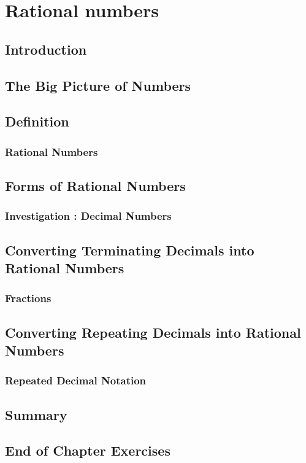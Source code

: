          \chapter{Rational numbers}
    \section{ Introduction}
    \section{ The Big Picture of Numbers}
    \section{ Definition}
            \subsection{ Rational Numbers }
    \section{ Forms of Rational Numbers}
            \subsection{  Investigation : Decimal Numbers }
    \section{ Converting Terminating Decimals into Rational Numbers}
            \subsection{  Fractions }
    \section{ Converting Repeating Decimals into Rational Numbers}
            \subsection{  Repeated Decimal Notation }
    \section{ Summary}
    \section{ End of Chapter Exercises}
